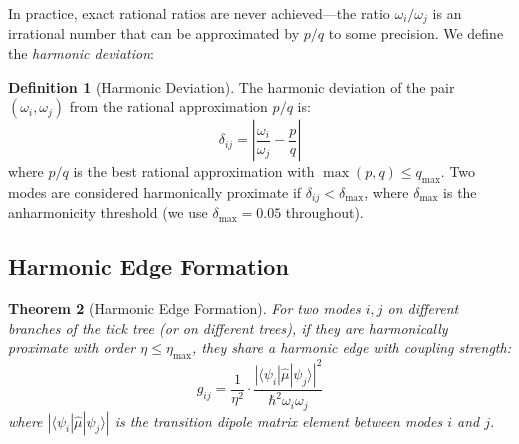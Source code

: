 \documentclass[11pt,a4paper]{article}
\newtheorem{theorem}{Theorem}[section]
\theoremstyle{definition}
\newtheorem{definition}[theorem]{Definition}
\theoremstyle{remark}
\newcommand{\qmax}{q_{\mathrm{max}}}
\newcommand{\etamax}{\eta_{\mathrm{max}}}
\begin{document}
In practice, exact rational ratios are never achieved---the ratio $\omega_i/\omega_j$ is an irrational number that can be approximated by $p/q$ to some precision. We define the \emph{harmonic deviation}:

\begin{definition}[Harmonic Deviation]
\label{def:harmonic_deviation}
The harmonic deviation of the pair $(\omega_i, \omega_j)$ from the rational approximation $p/q$ is:
\begin{equation}
\delta_{ij} = \left| \frac{\omega_i}{\omega_j} - \frac{p}{q} \right|
\label{eq:harmonic_deviation}
\end{equation}
where $p/q$ is the best rational approximation with $\max(p, q) \leq \qmax$. Two modes are considered harmonically proximate if $\delta_{ij} < \delta_{\max}$, where $\delta_{\max}$ is the anharmonicity threshold (we use $\delta_{\max} = 0.05$ throughout).
\end{definition}

\subsection{Harmonic Edge Formation}

\begin{theorem}[Harmonic Edge Formation]
\label{thm:harmonic_edge}
For two modes $i, j$ on different branches of the tick tree (or on different trees), if they are harmonically proximate with order $\eta \leq \etamax$, they share a harmonic edge with coupling strength:
\begin{equation}
g_{ij} = \frac{1}{\eta^2} \cdot \frac{|\langle \psi_i | \hat{\mu} | \psi_j \rangle|^2}{\hbar^2 \omega_i \omega_j}
\label{eq:coupling_strength}
\end{equation}
where $|\langle \psi_i | \hat{\mu} | \psi_j \rangle|$ is the transition dipole matrix element between modes $i$ and $j$.
\end{theorem}
\end{document}
